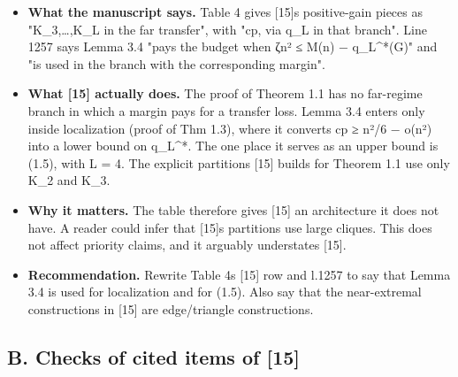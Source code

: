 \documentclass[
]{article}
\providecommand{\tightlist}{%
  \setlength{\itemsep}{0pt}\setlength{\parskip}{0pt}}
\begin{document}
\begin{itemize}
\tightlist
\item
  \textbf{What the manuscript says.} Table 4 gives
  {[}15{]}\textquotesingle s positive-gain pieces as "K\_3,\ldots,K\_L
  in the far transfer", with "cp, via q\_L in that branch". Line 1257
  says Lemma 3.4 "pays the budget when ζn² ≤ M(n) − q\_L\^{}*(G)" and
  "is used in the branch with the corresponding margin".
\item
  \textbf{What {[}15{]} actually does.} The proof of Theorem 1.1 has no
  far-regime branch in which a margin pays for a transfer loss. Lemma
  3.4 enters only inside localization (proof of Thm 1.3), where it
  converts cp ≥ n²/6 − o(n²) into a lower bound on q\_L\^{}*. The one
  place it serves as an upper bound is (1.5), with L = 4. The explicit
  partitions {[}15{]} builds for Theorem 1.1 use only K\_2 and K\_3.
\item
  \textbf{Why it matters.} The table therefore gives {[}15{]} an
  architecture it does not have. A reader could infer that
  {[}15{]}\textquotesingle s partitions use large cliques. This does not
  affect priority claims, and it arguably understates {[}15{]}.
\item
  \textbf{Recommendation.} Rewrite Table 4\textquotesingle s {[}15{]}
  row and l.1257 to say that Lemma 3.4 is used for localization and for
  (1.5). Also say that the near-extremal constructions in {[}15{]} are
  edge/triangle constructions.
\end{itemize}

\subsection{B. Checks of cited items of
{[}15{]}}\label{b-checks-of-cited-items-of-15}
\end{document}
